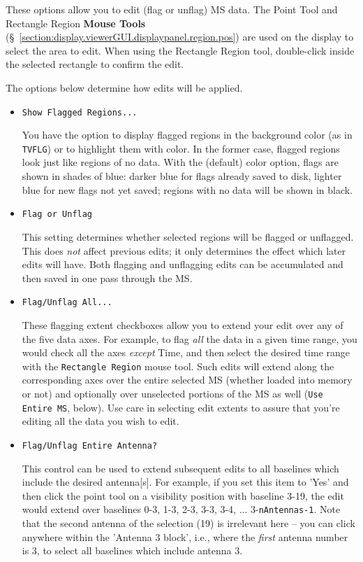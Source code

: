 These options allow you to edit (flag or unflag) MS data.
The Point Tool and Rectangle Region {\bf Mouse Tools}
(\S~\ref{section:display.viewerGUI.displaypanel.region.pos}) are used on
the display to select the area to edit.  When using the Rectangle Region
tool, double-click inside the selected rectangle to confirm the edit.

The options below determine how edits will be applied.

\begin{itemize}

\item {\tt Show Flagged Regions...}

You have the option to display flagged regions in the background
color (as in {\tt TVFLG}) or to highlight them with color.
In the former case, flagged regions look just like regions of no
data.  With the (default) color option, flags are shown in shades of blue:
darker blue for flags already saved to disk, lighter blue for
new flags not yet saved; regions with no data will be shown in black.

\item {\tt Flag or Unflag}

This setting determines whether selected regions will be flagged or
unflagged.  This does {\it not} affect previous
edits; it only determines the effect which later edits
will have.  Both flagging and unflagging edits can be accumulated
and then saved in one pass through the MS.

\item {\tt Flag/Unflag All...}

These flagging extent checkboxes allow you to extend your edit over any
of the five data axes.  For example, to flag {\it all} the data in a given
time range, you would check all the axes {\it except} Time, and then
select the desired time range with the {\tt Rectangle Region} mouse tool.
Such edits will extend along the corresponding axes over the entire selected
MS (whether loaded into memory or not) and optionally over unselected 
portions of the MS as well ({\tt Use Entire MS}, below).  Use care in
selecting edit extents to assure that you're editing all
the data you wish to edit.

\item {\tt Flag/Unflag Entire Antenna?}

This control can be used to extend subsequent edits to all baselines
which include the desired antenna[s].  For example, if you set this item
to 'Yes' and then click the point tool on a visibility position with
baseline 3-19, the edit would extend over baselines 0-3, 1-3, 2-3, 3-3,
3-4, ... 3-{\tt nAntennas-1}.  Note that the second antenna of the selection
(19) is irrelevant here -- you can click anywhere within the 'Antenna 3 block',
i.e., where the {\em first} antenna number is 3, to select all baselines
which include antenna 3.


\end{itemize}
